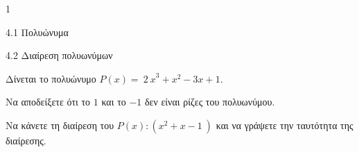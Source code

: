 \begin{ylh}{1}
\item 4.1 Πολυώνυμα
\item 4.2 Διαίρεση πολυωνύμων
\end{ylh}
Δίνεται το πολυώνυμο $P(x) = \ {2\ x}^{3} + x^{2} - 3x + 1$.
\begin{alist}
\item Να αποδείξετε ότι το $1$ και το $- 1$ δεν είναι ρίζες του πολυωνύμου.
\item Να κάνετε τη διαίρεση του $P(x):\left( x^{2} + x - 1\  \right)$ και να γράψετε την ταυτότητα της διαίρεσης.
\end{alist}

